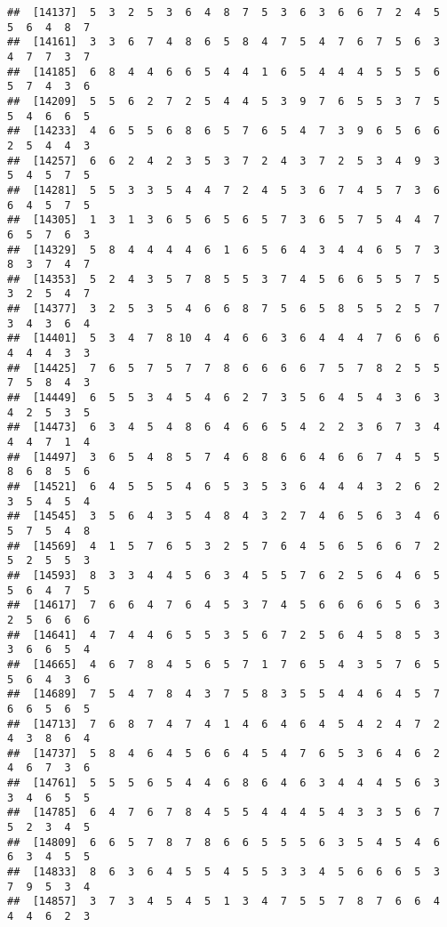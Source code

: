 \documentclass[
]{book}
\begin{document}
\begin{verbatim}
##  [14137]  5  3  2  5  3  6  4  8  7  5  3  6  3  6  6  7  2  4  5  5  6  4  8  7
##  [14161]  3  3  6  7  4  8  6  5  8  4  7  5  4  7  6  7  5  6  3  4  7  7  3  7
##  [14185]  6  8  4  4  6  6  5  4  4  1  6  5  4  4  4  5  5  5  6  5  7  4  3  6
##  [14209]  5  5  6  2  7  2  5  4  4  5  3  9  7  6  5  5  3  7  5  5  4  6  6  5
##  [14233]  4  6  5  5  6  8  6  5  7  6  5  4  7  3  9  6  5  6  6  2  5  4  4  3
##  [14257]  6  6  2  4  2  3  5  3  7  2  4  3  7  2  5  3  4  9  3  5  4  5  7  5
##  [14281]  5  5  3  3  5  4  4  7  2  4  5  3  6  7  4  5  7  3  6  6  4  5  7  5
##  [14305]  1  3  1  3  6  5  6  5  6  5  7  3  6  5  7  5  4  4  7  6  5  7  6  3
##  [14329]  5  8  4  4  4  4  6  1  6  5  6  4  3  4  4  6  5  7  3  8  3  7  4  7
##  [14353]  5  2  4  3  5  7  8  5  5  3  7  4  5  6  6  5  5  7  5  3  2  5  4  7
##  [14377]  3  2  5  3  5  4  6  6  8  7  5  6  5  8  5  5  2  5  7  3  4  3  6  4
##  [14401]  5  3  4  7  8 10  4  4  6  6  3  6  4  4  4  7  6  6  6  4  4  4  3  3
##  [14425]  7  6  5  7  5  7  7  8  6  6  6  6  7  5  7  8  2  5  5  7  5  8  4  3
##  [14449]  6  5  5  3  4  5  4  6  2  7  3  5  6  4  5  4  3  6  3  4  2  5  3  5
##  [14473]  6  3  4  5  4  8  6  4  6  6  5  4  2  2  3  6  7  3  4  4  4  7  1  4
##  [14497]  3  6  5  4  8  5  7  4  6  8  6  6  4  6  6  7  4  5  5  8  6  8  5  6
##  [14521]  6  4  5  5  5  4  6  5  3  5  3  6  4  4  4  3  2  6  2  3  5  4  5  4
##  [14545]  3  5  6  4  3  5  4  8  4  3  2  7  4  6  5  6  3  4  6  5  7  5  4  8
##  [14569]  4  1  5  7  6  5  3  2  5  7  6  4  5  6  5  6  6  7  2  5  2  5  5  3
##  [14593]  8  3  3  4  4  5  6  3  4  5  5  7  6  2  5  6  4  6  5  5  6  4  7  5
##  [14617]  7  6  6  4  7  6  4  5  3  7  4  5  6  6  6  6  5  6  3  2  5  6  6  6
##  [14641]  4  7  4  4  6  5  5  3  5  6  7  2  5  6  4  5  8  5  3  3  6  6  5  4
##  [14665]  4  6  7  8  4  5  6  5  7  1  7  6  5  4  3  5  7  6  5  5  6  4  3  6
##  [14689]  7  5  4  7  8  4  3  7  5  8  3  5  5  4  4  6  4  5  7  6  6  5  6  5
##  [14713]  7  6  8  7  4  7  4  1  4  6  4  6  4  5  4  2  4  7  2  4  3  8  6  4
##  [14737]  5  8  4  6  4  5  6  6  4  5  4  7  6  5  3  6  4  6  2  4  6  7  3  6
##  [14761]  5  5  5  6  5  4  4  6  8  6  4  6  3  4  4  4  5  6  3  3  4  6  5  5
##  [14785]  6  4  7  6  7  8  4  5  5  4  4  4  5  4  3  3  5  6  7  5  2  3  4  5
##  [14809]  6  6  5  7  8  7  8  6  6  5  5  5  6  3  5  4  5  4  6  6  3  4  5  5
##  [14833]  8  6  3  6  4  5  5  4  5  5  3  3  4  5  6  6  6  5  3  7  9  5  3  4
##  [14857]  3  7  3  4  5  4  5  1  3  4  7  5  5  7  8  7  6  6  4  4  4  6  2  3

\end{verbatim}
\end{document}
